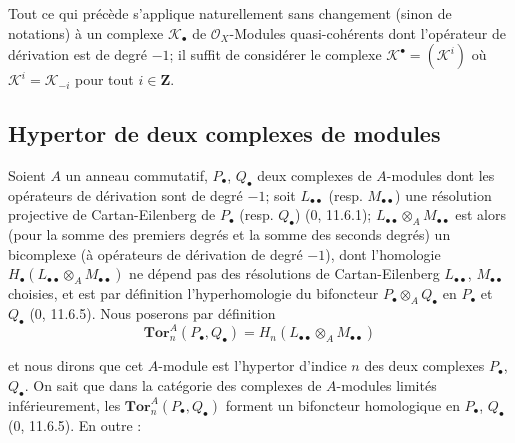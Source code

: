 \begin{env}[6.2.7]
Tout ce qui précède s'applique naturellement sans changement (sinon de
notations) à un complexe $\mathscr K_\bullet$ de $\mathscr O_X$-Modules
quasi-cohérents dont l'opérateur de dérivation est de degré $-1$; il suffit
de considérer le complexe $\mathscr K^\bullet=(\mathscr K^i)$ où
$\mathscr K^i=\mathscr K_{-i}$ pour tout $i\in\mathbf Z$.
\end{env}

\subsection{Hypertor de deux complexes de modules}
\label{subsection:III.6.3.fr}

\begin{env}[6.3.1]
Soient $A$ un anneau commutatif, $P_\bullet$, $Q_\bullet$ deux complexes de
$A$-modules dont les opérateurs de dérivation sont de degré $-1$; soit
$L_{\bullet\bullet}$ (resp. $M_{\bullet\bullet}$) une résolution projective
de Cartan-Eilenberg de $P_\bullet$ (resp. $Q_\bullet$) (0, 11.6.1);
$L_{\bullet\bullet}\otimes_A M_{\bullet\bullet}$ est alors (pour la somme
des premiers degrés et la somme des seconds degrés) un bicomplexe (à
opérateurs de dérivation de degré $-1$), dont l'homologie
$H_\bullet(L_{\bullet\bullet}\otimes_A M_{\bullet\bullet})$ ne dépend pas des
résolutions de Cartan-Eilenberg $L_{\bullet\bullet}$,
$M_{\bullet\bullet}$ choisies, et est par définition l'hyperhomologie du
bifoncteur $P_\bullet\otimes_A Q_\bullet$ en $P_\bullet$ et $Q_\bullet$
(0, 11.6.5). Nous poserons par définition
\[
  \mathbf{Tor}_n^A(P_\bullet,Q_\bullet)
  =H_n(L_{\bullet\bullet}\otimes_A M_{\bullet\bullet})
  \tag{6.3.1.1}\label{III.6.3.1.1.fr}
\]


et nous dirons que cet $A$-module est l'hypertor d'indice $n$ des deux
complexes $P_\bullet$, $Q_\bullet$. On sait que dans la catégorie des
complexes de $A$-modules limités inférieurement, les
$\mathbf{Tor}_n^A(P_\bullet,Q_\bullet)$ forment un bifoncteur homologique en
$P_\bullet$, $Q_\bullet$ (0, 11.6.5). En outre :
\end{env}

